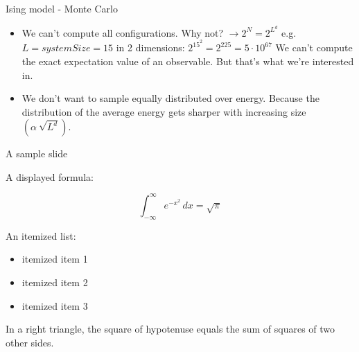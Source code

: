 \documentclass[handout]{beamer}
\begin{document}
\begin{frame}{Ising model - Monte Carlo}
\begin{itemize}
\item<2-> We can't compute all configurations.
	 {Why not? \( \rightarrow 2^N = 2^{L^d} \) e.g. \( L = systemSize = 15 \) in 2 dimensions: \(2^{15^2} = 2^{225} = 5 \cdot 10^{67}\)}
	 {We can't compute the exact expectation value of an observable. But that's what we're interested in.}
\item<3-> We don't want to sample equally distributed over energy.
	 {Because the distribution of the average energy gets sharper with increasing size \(\left(\alpha \ \sqrt{L^d}\right)\).}
\end{itemize}
\end{frame}











\begin{frame}{A sample slide}

A displayed formula:

\[
  \int_{-\infty}^\infty e^{-x^2} \, dx = \sqrt{\pi}
\]

An itemized list:

\begin{itemize}
  \item itemized item 1
  \item itemized item 2
  \item itemized item 3
\end{itemize}

\begin{theorem}
  In a right triangle, the square of hypotenuse equals
  the sum of squares of two other sides.
\end{theorem}

\end{frame}
\end{document}
